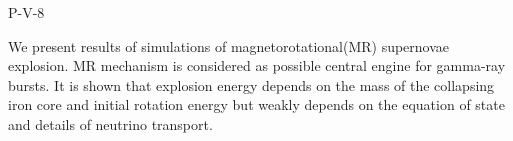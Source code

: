 P-V-8


\bigskip



\bigskip

\noindent We present results of simulations of magnetorotational(MR) supernovae explosion. MR mechanism is considered as possible central engine for gamma-ray bursts. It is shown that explosion energy depends on the mass of the collapsing iron core and initial rotation energy but weakly depends on the equation of state and details of neutrino transport.
